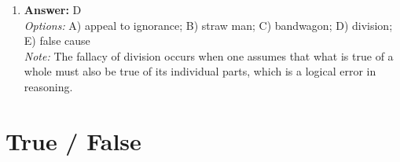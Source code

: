 \documentclass[12pt]{article}
\begin{document}
\begin{enumerate}[label=\arabic*.]
\\ \textit{Note:} Singer argues that famine relief organizations prioritize the sheer number of individuals aided rather than the effectiveness or quality of the assistance provided, which can result in resources being misallocated and not addressing the most pressing needs of those affected.
\item \textbf{Answer:} D
\\ \textit{Options:} A) appeal to ignorance; B) straw man; C) bandwagon; D) division; E) false cause
\\ \textit{Note:} The fallacy of division occurs when one assumes that what is true of a whole must also be true of its individual parts, which is a logical error in reasoning.
\end{enumerate}

\section*{True / False}
\end{document}
